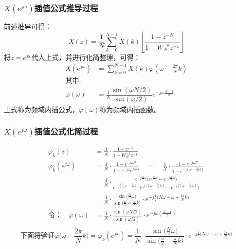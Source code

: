 \documentclass[notheorems,compress,mathserif,table]{beamer}
\begin{document}
\begin{frame}[shrink]\frametitle{$ X(e^{j\omega}) $插值公式推导过程}
前述推导可得：
$$X(z) =  \frac{1}{N}\sum_{k=0}^{N-1}X(k)\left[\dfrac{1-z^{-N}}{1-W_N^{-k}z^{-1}} \right] $$
将$ z = e^{j\omega} $代入上式，并进行化简整理，可得：
\begin{equation*}
\begin{split}
X(e^{j\omega})  &= \sum_{k=0}^{N-1}X(k) \varphi\left(\omega - \frac{2\pi}{N}k \right) \\
\mbox{其中:}    & \quad  \\
\varphi(\omega) &= \frac{1}{N} \dfrac{\sin(\omega N/2)}{sin(\omega /2)}e^{-j\omega \frac{N-1}{2}}  
\end{split}
\end{equation*}
上式称为频域内插公式，$ \varphi(\omega) $称为{\Large 频域内插函数}。
\end{frame}




\begin{frame}[shrink]\frametitle{$ X(e^{j\omega}) $插值公式化简过程}%
\begin{equation*}
\begin{split}
\varphi_k(z)   &= \frac{1}{N}\cdot\frac{1-z^{-N}}{1-W_N^{-k}z^{-1}} \\
\varphi_k(e^{j\omega})
      &= \frac{1}{N}\cdot\frac{1-e^{-j\omega N}}{1-e^{-j\omega}e^{j\frac{2\pi}{N}k}} \quad =\quad  \frac{1}{N}\cdot\frac{1-e^{-j\omega N}}{1-e^{-j(\omega-\frac{2\pi}{N}k)}}\\
      &= \frac{1}{N}\cdot\frac{e^{-j\frac{N}{2}\omega}\big(e^{j\frac{N}{2}\omega}-e^{-j\frac{N}{2}\omega}\big)}
                {e^{-j\frac{1}{2}(\omega- \frac{2\pi}{N}k)}\big( e^{j\frac{1}{2}(\omega- \frac{2\pi}{N}k)} -e^{-j\frac{1}{2}(\omega- \frac{2\pi}{N}k)}  \big)}\\
      &= \frac{1}{N}\cdot\frac{\sin\big(\frac{N}{2}\omega\big)}{\sin\Big(\frac{\omega}{2} -\frac{\pi}{N}k\Big)}\cdot e^{-j\frac{1}{2}\big(N\omega-\omega + \frac{2\pi}{N}k\big) }\\
 \mbox{令：} \quad  \varphi(\omega)
      &= \frac{1}{N}\cdot\frac{\sin(\omega N/2)}{\sin(\omega/2)}\cdot e^{-j\omega(\frac{N-1}{2}) }\\
\end{split}
\end{equation*}
$$\mbox{下面将验证}\varphi\Big(\omega-\frac{2\pi}{N}k\Big) =\varphi_k(e^{j\omega}) =\frac{1}{N}\cdot\frac{\sin\big(\frac{N}{2}\omega\big)}{\sin\Big(\frac{\omega}{2} -\frac{\pi}{N}k\Big)}\cdot e^{-j\frac{1}{2}\big(N\omega-\omega + \frac{2\pi}{N}k\big) } $$
\end{frame}
\end{document}
